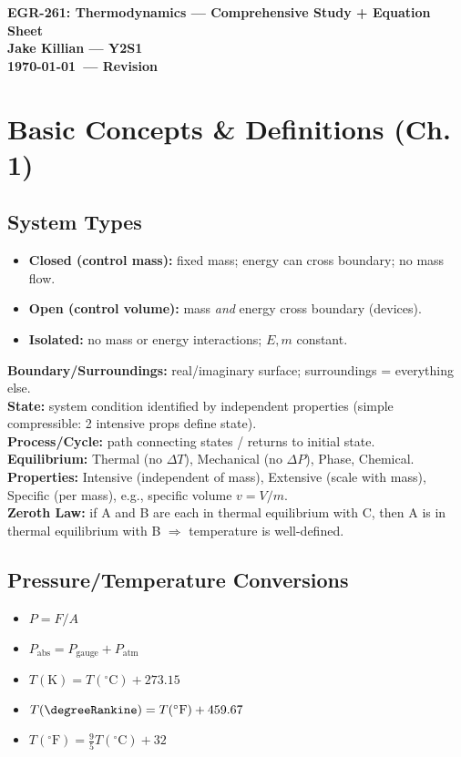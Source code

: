 \documentclass[10pt]{article}
\begin{document}
\begin{center}
\textbf{EGR-261: Thermodynamics — Comprehensive Study + Equation Sheet} \\
\textbf{Jake Killian — Y2S1} \\
\textbf{\today\ — Revision}
\end{center}

\section{Basic Concepts \& Definitions (Ch. 1)}
\begin{multicols}{2}

\subsection{System Types}
\begin{itemize}
    \item \textbf{Closed (control mass):} fixed mass; energy can cross boundary; no mass flow.
    \item \textbf{Open (control volume):} mass \emph{and} energy cross boundary (devices).
    \item \textbf{Isolated:} no mass or energy interactions; $E,m$ constant.
\end{itemize}
\textbf{Boundary/Surroundings:} real/imaginary surface; surroundings = everything else. \\
\textbf{State:} system condition identified by independent properties (simple compressible: 2 intensive props define state). \\
\textbf{Process/Cycle:} path connecting states / returns to initial state. \\
\textbf{Equilibrium:} Thermal (no $\Delta T$), Mechanical (no $\Delta P$), Phase, Chemical. \\
\textbf{Properties:} Intensive (independent of mass), Extensive (scale with mass), Specific (per mass), e.g., specific volume $v=V/m$. \\
\textbf{Zeroth Law:} if A and B are each in thermal equilibrium with C, then A is in thermal equilibrium with B $\Rightarrow$ temperature is well-defined. \\

\subsection{Pressure/Temperature Conversions}
\begin{itemize}
    \item $P = F/A$
    \item $P_{\text{abs}} = P_{\text{gauge}} + P_{\text{atm}}$
    \item $T(\si{\kelvin}) = T(^{\circ}\mathrm{C}) + 273.15$
    \item $T(\si{\degreeRankine}) = T(^{\circ}\mathrm{F}) + 459.67$
    \item $T(^{\circ}\mathrm{F}) = \frac{9}{5}T(^{\circ}\mathrm{C})+32$
\end{itemize}


\end{multicols}
\end{document}
